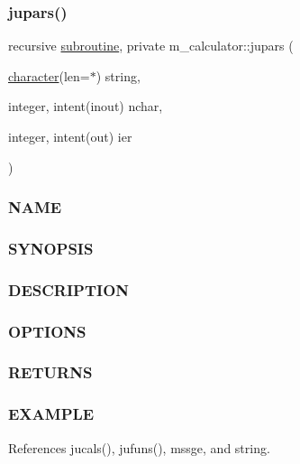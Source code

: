 \subsubsection{\texorpdfstring{jupars()}{jupars()}}
{\footnotesize\ttfamily recursive \hyperlink{M__stopwatch_83_8txt_acfbcff50169d691ff02d4a123ed70482}{subroutine}, private m\+\_\+calculator\+::jupars (\begin{DoxyParamCaption}\item[{\hyperlink{option__stopwatch_83_8txt_abd4b21fbbd175834027b5224bfe97e66}{character}(len=$\ast$)}]{string,  }\item[{integer, intent(inout)}]{nchar,  }\item[{integer, intent(out)}]{ier }\end{DoxyParamCaption})\hspace{0.3cm}{\ttfamily [private]}}



\subsubsection*{N\+A\+ME}

\subsubsection*{S\+Y\+N\+O\+P\+S\+IS}

\subsubsection*{D\+E\+S\+C\+R\+I\+P\+T\+I\+ON}

\subsubsection*{O\+P\+T\+I\+O\+NS}

\subsubsection*{R\+E\+T\+U\+R\+NS}

\subsubsection*{E\+X\+A\+M\+P\+LE}

References jucals(), jufuns(), mssge, and string.

